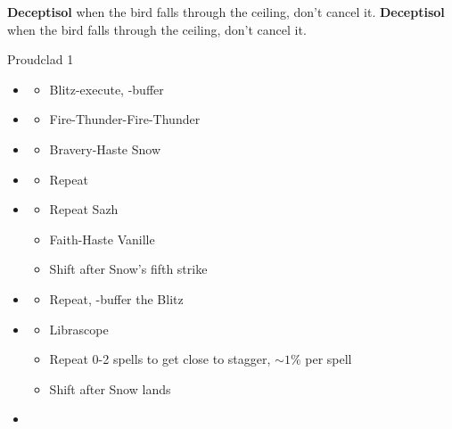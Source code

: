 \begin{paracol}{2}
\textbf{Deceptisol} when the bird falls through the ceiling, don't cancel it.
\switchcolumn
{}
\textbf{Deceptisol} when the bird falls through the ceiling, don't cancel it.
\switchcolumn*
\begin{battle}{Proudclad 1}
	\begin{itemize}
		\item \second
		      \begin{itemize}
			      \item Blitz-execute, \rav-buffer
		      \end{itemize}
		\item \sixth
		      \begin{itemize}
			      \item Fire-Thunder-Fire-Thunder
		      \end{itemize}
		\item \fourth
		      \begin{itemize}
			      \item Bravery-Haste Snow
		      \end{itemize}
		\item \sixth
		      \begin{itemize}
			      \item Repeat
		      \end{itemize}
		\item \fourth
		      \begin{itemize}
			      \item Repeat Sazh
			      \item Faith-Haste Vanille
			      \item Shift after Snow's fifth strike
		      \end{itemize}
		\item \first
		      \begin{itemize}
			      \item Repeat, \rav-buffer the Blitz
		      \end{itemize}
		\item \fifth
		      \begin{itemize}
			      \item Librascope
			      \item Repeat 0-2 spells to get close to stagger, $\sim1\%$ per spell
			      \item Shift after Snow lands
		      \end{itemize}
		\item \sixth

\end{itemize}
\end{battle}
\end{paracol}
